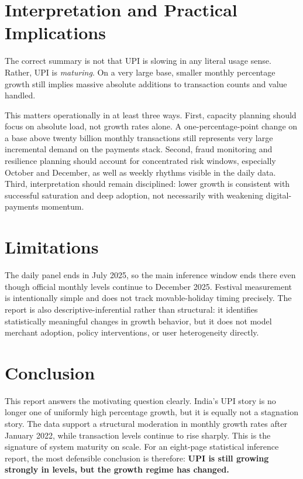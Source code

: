 \documentclass[11pt]{article}
\begin{document}
\section{Interpretation and Practical Implications}

The correct summary is not that UPI is slowing in any literal usage sense. Rather, UPI is \emph{maturing}. On a very large base, smaller monthly percentage growth still implies massive absolute additions to transaction counts and value handled.

This matters operationally in at least three ways. First, capacity planning should focus on absolute load, not growth rates alone. A one-percentage-point change on a base above twenty billion monthly transactions still represents very large incremental demand on the payments stack. Second, fraud monitoring and resilience planning should account for concentrated risk windows, especially October and December, as well as weekly rhythms visible in the daily data. Third, interpretation should remain disciplined: lower growth is consistent with successful saturation and deep adoption, not necessarily with weakening digital-payments momentum.

\section{Limitations}

The daily panel ends in July 2025, so the main inference window ends there even though official monthly levels continue to December 2025. Festival measurement is intentionally simple and does not track movable-holiday timing precisely. The report is also descriptive-inferential rather than structural: it identifies statistically meaningful changes in growth behavior, but it does not model merchant adoption, policy interventions, or user heterogeneity directly.

\section{Conclusion}

This report answers the motivating question clearly. India's UPI story is no longer one of uniformly high percentage growth, but it is equally not a stagnation story. The data support a structural moderation in monthly growth rates after January 2022, while transaction levels continue to rise sharply. This is the signature of system maturity on scale. For an eight-page statistical inference report, the most defensible conclusion is therefore: \textbf{UPI is still growing strongly in levels, but the growth regime has changed.}
\end{document}
